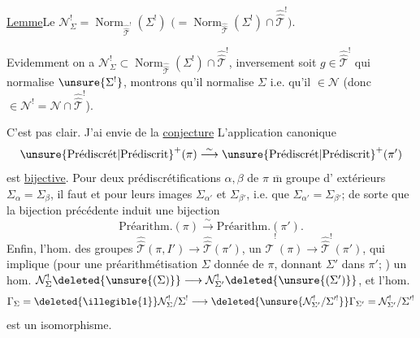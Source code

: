 \uline{Lemme}\quad Le
$\mathcal N^{!}_{\Sigma}=\operatorname{Norm}_{\widehat{\widehat{\mathcal T}}^{!}}(\Sigma^{!})$
$\bigl(=\operatorname{Norm}_{\widehat{\widehat{\mathcal T}}}(\Sigma^{!})\cap
\widehat{\widehat{\mathcal T}}^{!}\bigr)$.


Evidemment on a
$\mathcal N^{!}_{\Sigma}\subset
\operatorname{Norm}_{\widehat{\widehat{\mathcal T}}}(\Sigma^{!})\cap
\widehat{\widehat{\mathcal T}}^{!}$,
inversement soit $g\in\widehat{\widehat{\mathcal T}}^{!}$ qui normalise
$\unsure{\Sigma^{!}}$, montrons qu'il normalise $\Sigma$ i.e.
qu'il  $\in\mathcal N$
(donc $\in\mathcal N^{!}=\mathcal N\cap\widehat{\widehat{\mathcal T}}^{!}$).


C'est pas clair. J'ai  envie de   la
\uline{conjecture} L'application canonique
\[
\unsure{\text{Prédiscrét}|\text{Prédiscrit}}^{+}(\pi)
 \overset{\sim}{\longrightarrow}
\unsure{\text{Prédiscrét}|\text{Prédiscrit}}^{+}(\pi')
\]
est \uline{bijective}. Pour  deux prédiscrétifications 
$\alpha,\beta$ de $\pi$   $\overline{\mathrm m}$ groupe d' extérieurs
$\Sigma_\alpha=\Sigma_\beta$,  il faut et 
 
pour leurs images $\Sigma_{\alpha'}$ et $\Sigma_{\beta'}$, i.e. que
$\Sigma_{\alpha'}=\Sigma_{\beta'}$; de sorte que la bijection précédente induit une bijection
\[
\text{Préarithm.}(\pi)\overset{\sim}{\longrightarrow}\text{Préarithm.}(\pi').
\]
Enfin, 
l'hom. des groupes 
$\widehat{\widehat{\mathcal T}}(\pi,I')\longrightarrow\widehat{\widehat{\mathcal T}}(\pi')$,
 
un $\widehat{\widehat{\mathcal T}}^{!}(\pi)\longrightarrow\widehat{\widehat{\mathcal T}}^{!}(\pi')$,
 qui implique 
(pour une préarithmétisation $\Sigma$ 
donnée de $\pi$, donnant $\Sigma'$ 
dans $\pi'$; ) un
hom.
$\mathcal N_\Sigma^{!}\deleted{\unsure{(\Sigma)}}\longrightarrow
\mathcal N_{\Sigma'}^{!}\deleted{\unsure{(\Sigma')}}$,
 et l'hom. 
\[
\Gamma_\Sigma=\deleted{\illegible{1}}\mathcal N_\Sigma^{!}/\Sigma^{!}
 \longrightarrow
\deleted{\unsure{\mathcal N_{\Sigma'}^{!}/\Sigma'^{!}}}\Gamma_{\Sigma'}=\mathcal N_{\Sigma'}^{!}/\Sigma'^{!}
\]
est un isomorphisme.

